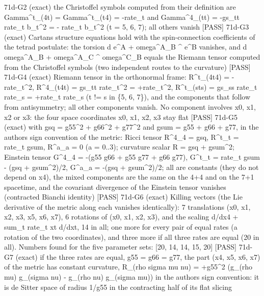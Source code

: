 \documentclass[
  10pt,
]{article}
\newenvironment{Shaded}{}{}
\newcommand{\NormalTok}[1]{#1}
\begin{document}
\begin{Shaded}
\begin{Highlighting}[]
\NormalTok{[PASS] 71d{-}G2  (exact) the Christoffel symbols computed from their definition are Gamma\^{}t\_(4t) = Gamma\^{}t\_(t4) = {-}rate\_t and Gamma\^{}4\_(tt) = {-}gs\_tt rate\_t b\_t\^{}2 = {-} rate\_t b\_t\^{}2 (t = 5, 6, 7); all others vanish}
\NormalTok{[PASS] 71d{-}G3  (exact) Cartan\textquotesingle{}s structure equations hold with the spin{-}connection coefficients of the tetrad postulate: the torsion d e\^{}A + omega\^{}A\_B \^{} e\^{}B vanishes, and d omega\^{}A\_B + omega\^{}A\_C \^{} omega\^{}C\_B equals the Riemann tensor computed from the Christoffel symbols (two independent routes to the curvature)}
\NormalTok{[PASS] 71d{-}G4  (exact) Riemann tensor in the orthonormal frame: R\^{}t\_(4t4) = {-}rate\_t\^{}2, R\^{}4\_(t4t) = gs\_tt rate\_t\^{}2 = +rate\_t\^{}2, R\^{}t\_(sts) = gs\_ss rate\_t rate\_s = +rate\_t rate\_s (t != s in \{5, 6, 7\}), and the components that follow from antisymmetry; all other components vanish. No component involves x0, x1, x2 or x3: the four space coordinates x0, x1, x2, x3 stay flat}
\NormalTok{[PASS] 71d{-}G5  (exact) with gsq = g55\^{}2 + g66\^{}2 + g77\^{}2 and gsum = g55 + g66 + g77, in the author\textquotesingle{}s sign convention of the metric: Ricci tensor R\^{}4\_4 = gsq, R\^{}t\_t = rate\_t gsum, R\^{}a\_a = 0 (a = 0..3); curvature scalar R = gsq + gsum\^{}2; Einstein tensor G\^{}4\_4 = {-}(g55 g66 + g55 g77 + g66 g77), G\^{}t\_t = rate\_t gsum {-} (gsq + gsum\^{}2)/2, G\^{}a\_a = {-}(gsq + gsum\^{}2)/2; all are constants (they do not depend on x4), the mixed components are the same on the 4+4 and on the 7+1 spacetime, and the covariant divergence of the Einstein tensor vanishes (contracted Bianchi identity)}
\NormalTok{[PASS] 71d{-}G6  (exact) Killing vectors (the Lie derivative of the metric along each vanishes identically): 7 translations (x0, x1, x2, x3, x5, x6, x7), 6 rotations of (x0, x1, x2, x3), and the scaling d/dx4 + sum\_t rate\_t xt d/dxt, 14 in all; one more for every pair of equal rates (a rotation of the two coordinates), and three more if all three rates are equal (20 in all). Numbers found for the five parameter sets: [20, 14, 14, 15, 20]}
\NormalTok{[PASS] 71d{-}G7  (exact) if the three rates are equal, g55 = g66 = g77, the part (x4, x5, x6, x7) of the metric has constant curvature, R\_(rho sigma mu nu) = +g55\^{}2 (g\_(rho mu) g\_(sigma nu) {-} g\_(rho nu) g\_(sigma mu)) in the author\textquotesingle{}s sign convention: it is de Sitter space of radius 1/g55 in the contracting half of its flat slicing}

\end{Highlighting}
\end{Shaded}
\end{document}
